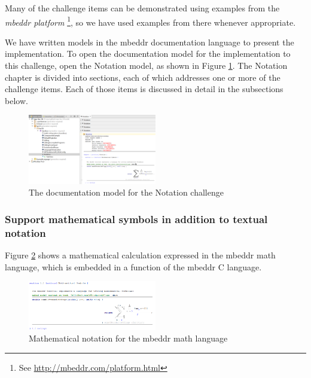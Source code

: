 \documentclass[preprint,numbers,10pt]{sigplanconf}
\begin{document}
Many of the challenge items can be demonstrated using examples from the \emph{mbeddr platform} \footnote{See \url{http://mbeddr.com/platform.html}}, so we have used examples from there whenever appropriate.

We have written models in the mbeddr documentation language to present the implementation. To open the documentation model for the implementation to this challenge, open the Notation model, as shown in Figure \ref{fig:opennotation}. The Notation chapter is divided into sections, each of which addresses one or more of the challenge items. Each of those items is discussed in detail in the subsections below.

\begin{figure}[p]
	\centering
	\includegraphics[width=0.50\textwidth]{screens/OpenNotation.png}
	\caption{The documentation model for the Notation challenge}
	\label{fig:opennotation}
\end{figure}

\subsubsection{Support mathematical symbols in addition to textual notation}
Figure \ref{fig:mathnotation} shows a mathematical calculation expressed in the mbeddr math language, which is embedded in a function of the mbeddr C language.
\begin{figure}[p]
	\centering
	\includegraphics[width=0.50\textwidth]{screens/MathematicalNotation.png}
	\caption{Mathematical notation for the mbeddr math language}
	\label{fig:mathnotation}
\end{figure}
\end{document}
